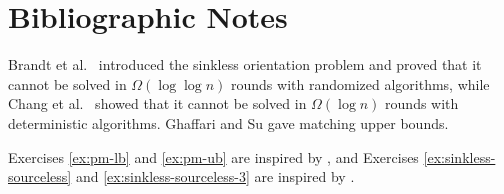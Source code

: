 \section{Bibliographic Notes}

Brandt et al.\ \cite{brandt16lll} introduced the sinkless orientation problem and proved that it cannot be solved in $\Omega(\log\log n)$ rounds with randomized algorithms, while Chang et al.\ \cite{chang16exponential} showed that it cannot be solved in $\Omega(\log n)$ rounds with deterministic algorithms. Ghaffari and Su \cite{ghaffari17distributed} gave matching upper bounds.

Exercises \ref{ex:pm-lb} and \ref{ex:pm-ub} are inspired by \cite{balliu20binary-labeling}, and Exercises \ref{ex:sinkless-sourceless} and \ref{ex:sinkless-sourceless-3} are inspired by \cite{ghaffari19degree-splitting}.
